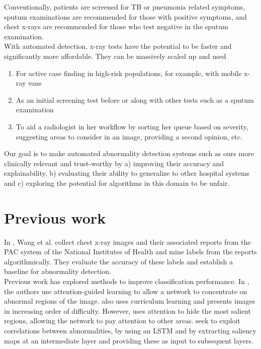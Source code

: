 \documentclass[12pt,oneside,a4paper]{report}
\begin{document}
Conventionally, patients are screened for TB or pneumonia related symptoms,
sputum examinations are recommended for those with positive symptoms, and chest
x-rays are recommended for those who test negative in the sputum examination.\\

With automated detection, x-ray tests have the potential to be faster and
significantly more affordable. They can be massively scaled up and used
\begin{enumerate}
\item{For active case finding in high-risk populations, for example, with mobile
    x-ray vans\cite{modi_suresh_2019}}
\item{As an initial screening test before or along with other tests such as a
    sputum examination}
\item{To aid a radiologist in her workflow by sorting her queue based on
    severity, suggesting areas to consider in an image, providing a second
    opinion, etc.}
\end{enumerate}

Our goal is to make automated abnormality detection systems such as ours more
clinically relevant and trust-worthy by a) improving their accuracy and
explainability, b) evaluating their ability to generalize to other hospital
systems and c) exploring the potential for algorithms in this domain to be
unfair.
\section{Previous work}
In \cite{Wang2017}, Wang et al. collect chest x-ray images and their associated
reports from the PAC system of the National Institutes of Health and mine labels
from the reports algorithmically. They evaluate the accuracy
of these labels and establish a baseline for abnormality detection.\\

Previous work has explored methods to improve classification performance. In
\cite{Guan2018,Tang2018,Wang2018b,Pesce2017}, the authors use attention-guided
learning to allow a network to concentrate on abnormal regions of the image.
\cite{Tang2018} also uses curriculum learning and presents images in increasing
order of difficulty. However, \cite{Cai2018} uses attention to hide the most
salient regions, allowing the network to pay attention to other areas.
\cite{Yao,Wang2018b} seek to exploit correlations between abnormalities,
\cite{Yao} by using an LSTM and \cite{Wang2018b} by extracting saliency maps at
an intermediate layer and providing these as input to subsequent layers.\\
\end{document}
